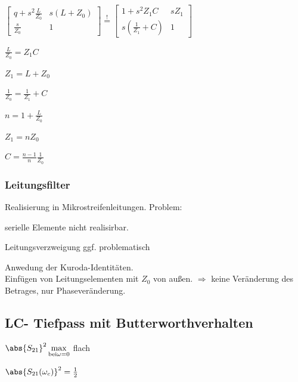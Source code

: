 $\begin{bmatrix}
    q + s^2\frac{L}{Z_0} & s(L + Z_0) \\ \frac{s}{Z_0} & 1
\end{bmatrix} \overset{!}{=} \begin{bmatrix}
    1 + s^2Z_1C & sZ_1 \\ s(\frac{1}{Z_1} + C) & 1
\end{bmatrix} $

\begin{pitemize}
    \item $\frac{L}{Z_0} = Z_1 C$
    \item $Z_1 = L + Z_0$
    \item $\frac{1}{Z_0} = \frac{1}{Z_1} + C$
    \item $n = 1 + \frac{L}{Z_0}$
    \item $Z_1 = nZ_0$
    \item $C = \frac{n-1}{n} \frac{1}{Z_0}$
\end{pitemize}


\subsubsection{Leitungsfilter}
Realisierung in Mikrostreifenleitungen.
Problem: 
\begin{pitemize}
    \item serielle Elemente nicht realisirbar.
    \item Leitungsverzweigung ggf. problematisch
\end{pitemize}

Anwedung der Kuroda-Identitäten. \\
Einfügen von Leitungselementen mit $Z_0$ von außen. $\Rightarrow$ keine Veränderung des Betrages, nur Phaseveränderung.





\subsection{LC- Tiefpass mit Butterworthverhalten}


\begin{pitemize}
    \item $\abs{S_{21}}^2 \max_{\mathrm{bei } \omega = 0}\limits$ flach
    \item $\abs{S_{21}(\omega_c)}^2 = \frac{1}{2}$
\end{pitemize}

